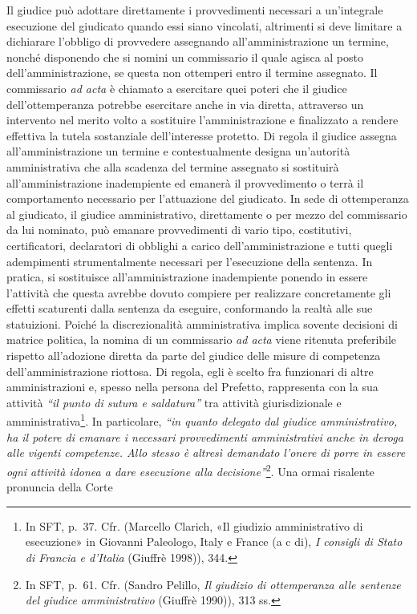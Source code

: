 \documentclass[12pt,it,a4paper,]{report}
\begin{document}
Il giudice può adottare direttamente i provvedimenti necessari a
un'integrale esecuzione del giudicato quando essi siano vincolati,
altrimenti si deve limitare a dichiarare l'obbligo di provvedere
assegnando all'amministrazione un termine, nonché disponendo che si
nomini un commissario il quale agisca al posto dell'amministrazione, se
questa non ottemperi entro il termine assegnato. Il commissario \emph{ad
acta} è chiamato a esercitare quei poteri che il giudice
dell'ottemperanza potrebbe esercitare anche in via diretta, attraverso
un intervento nel merito volto a sostituire l'amministrazione e
finalizzato a rendere effettiva la tutela sostanziale dell'interesse
protetto. Di regola il giudice assegna all'amministrazione un termine e
contestualmente designa un'autorità amministrativa che alla scadenza del
termine assegnato si sostituirà all'amministrazione inadempiente ed
emanerà il provvedimento o terrà il comportamento necessario per
l'attuazione del giudicato. In sede di ottemperanza al giudicato, il
giudice amministrativo, direttamente o per mezzo del commissario da lui
nominato, può emanare provvedimenti di vario tipo, costitutivi,
certificatori, declaratori di obblighi a carico dell'amministrazione e
tutti quegli adempimenti strumentalmente necessari per l'esecuzione
della sentenza. In pratica, si sostituisce all'amministrazione
inadempiente ponendo in essere l'attività che questa avrebbe dovuto
compiere per realizzare concretamente gli effetti scaturenti dalla
sentenza da eseguire, conformando la realtà alle sue statuizioni. Poiché
la discrezionalità amministrativa implica sovente decisioni di matrice
politica, la nomina di un commissario \emph{ad acta} viene ritenuta
preferibile rispetto all'adozione diretta da parte del giudice delle
misure di competenza dell'amministrazione riottosa. Di regola, egli è
scelto fra funzionari di altre amministrazioni e, spesso nella persona
del Prefetto, rappresenta con la sua attività \emph{``il punto di sutura
e saldatura''} tra attività giurisdizionale e amministrativa\footnote{In
  SFT, p.~37. Cfr. (Marcello Clarich, {«Il giudizio amministrativo di
  esecuzione»} in Giovanni Paleologo, Italy e France (a c di), \emph{I
  consigli di Stato di Francia e d'Italia} (Giuffrè 1998)), 344.}. In
particolare, \emph{``in quanto delegato dal giudice amministrativo, ha
il potere di emanare i necessari provvedimenti amministrativi anche in
deroga alle vigenti competenze. Allo stesso è altresì demandato l'onere
di porre in essere ogni attività idonea a dare esecuzione alla
decisione''}\footnote{In SFT, p.~61. Cfr. (Sandro Pelillo, \emph{Il
  giudizio di ottemperanza alle sentenze del giudice amministrativo}
  (Giuffrè 1990)), 313 ss.}. Una ormai risalente pronuncia della Corte
\end{document}
